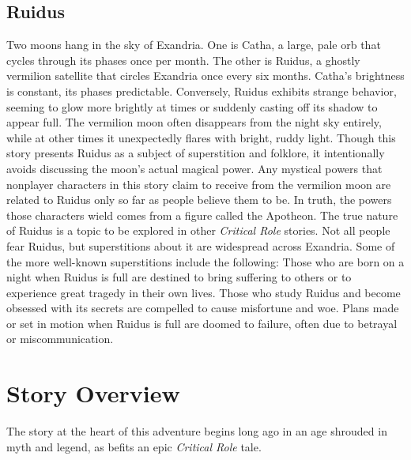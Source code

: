 \documentclass[10pt,a4,twoside,twocolumn,openany,nodeprecatedcode]{dndbook}
\begin{document}
\subsection{Ruidus}
Two moons hang in the sky of Exandria. One is Catha, a large, pale orb that cycles through its phases once per month. The other is Ruidus, a ghostly vermilion satellite that circles Exandria once every six months.
Catha's brightness is constant, its phases predictable. Conversely, Ruidus exhibits strange behavior, seeming to glow more brightly at times or suddenly casting off its shadow to appear full. The vermilion moon often disappears from the night sky entirely, while at other times it unexpectedly flares with bright, ruddy light.
Though this story presents Ruidus as a subject of superstition and folklore, it intentionally avoids discussing the moon's actual magical power. Any mystical powers that nonplayer characters in this story claim to receive from the vermilion moon are related to Ruidus only so far as people believe them to be. In truth, the powers those characters wield comes from a figure called the Apotheon. The true nature of Ruidus is a topic to be explored in other \textit{Critical Role} stories.
Not all people fear Ruidus, but superstitions about it are widespread across Exandria. Some of the more well-known superstitions include the following:
{{Those who are born on a night when Ruidus is full are destined to bring suffering to others or to experience great tragedy in their own lives.}}
{{Those who study Ruidus and become obsessed with its secrets are compelled to cause misfortune and woe.}}
{{Plans made or set in motion when Ruidus is full are doomed to failure, often due to betrayal or miscommunication.}}
\section{Story Overview}
The story at the heart of this adventure begins long ago in an age shrouded in myth and legend, as befits an epic \textit{Critical Role} tale.
\end{document}
